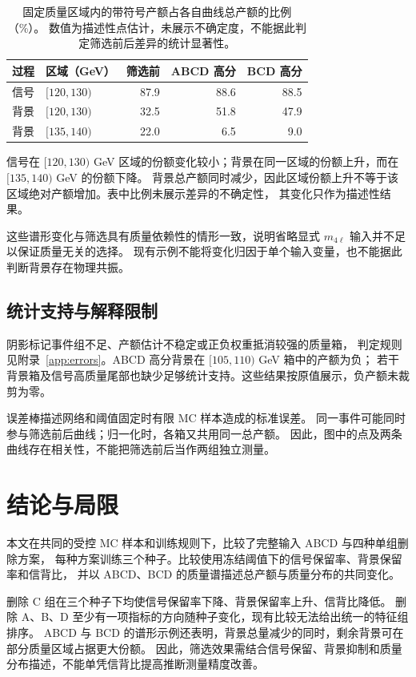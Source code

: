 \documentclass[11pt,a4paper,fontset=fandol,scheme=plain]{ctexart}
\begin{document}
\begin{table}[H]
\caption{固定质量区域内的带符号产额占各自曲线总产额的比例（\%）。
数值为描述性点估计，未展示不确定度，不能据此判定筛选前后差异的统计显著性。}
\label{tab:fractions}
\centering
\small
\begin{tabular}{llrrr}
\toprule
过程 & 区域（GeV） & 筛选前 & ABCD 高分 & BCD 高分 \\
\midrule
信号 & $[120,130)$ & 87.9 & 88.6 & 88.5 \\
背景 & $[120,130)$ & 32.5 & 51.8 & 47.9 \\
背景 & $[135,140)$ & 22.0 & 6.5 & 9.0 \\
\bottomrule
\end{tabular}
\end{table}

信号在 $[120,130)$ GeV 区域的份额变化较小；背景在同一区域的份额上升，而在 $[135,140)$ GeV 的份额下降。
背景总产额同时减少，因此区域份额上升不等于该区域绝对产额增加。表中比例未展示差异的不确定性，
其变化只作为描述性结果。

这些谱形变化与筛选具有质量依赖性的情形一致，说明省略显式 $m_{4\ell}$ 输入并不足以保证质量无关的选择。
现有示例不能将变化归因于单个输入变量，也不能据此判断背景存在物理共振。
\FloatBarrier

\subsection{统计支持与解释限制}
阴影标记事件组不足、产额估计不稳定或正负权重抵消较强的质量箱，
判定规则见附录~\ref{app:errors}。ABCD 高分背景在 $[105,110)$ GeV 箱中的产额为负；
若干背景箱及信号高质量尾部也缺少足够统计支持。这些结果按原值展示，负产额未裁剪为零。

误差棒描述网络和阈值固定时有限 MC 样本造成的标准误差。
同一事件可能同时参与筛选前后曲线；归一化时，各箱又共用同一总产额。
因此，图中的点及两条曲线存在相关性，不能把筛选前后当作两组独立测量。


\section{结论与局限}\label{sec:conclusion}

本文在共同的受控 MC 样本和训练规则下，比较了完整输入 ABCD 与四种单组删除方案，
每种方案训练三个种子。比较使用冻结阈值下的信号保留率、背景保留率和信背比，
并以 ABCD、BCD 的质量谱描述总产额与质量分布的共同变化。

删除 C 组在三个种子下均使信号保留率下降、背景保留率上升、信背比降低。
删除 A、B、D 至少有一项指标的方向随种子变化，现有比较无法给出统一的特征组排序。
ABCD 与 BCD 的谱形示例还表明，背景总量减少的同时，剩余背景可在部分质量区域占据更大份额。
因此，筛选效果需结合信号保留、背景抑制和质量分布描述，不能单凭信背比提高推断测量精度改善。
\end{document}
